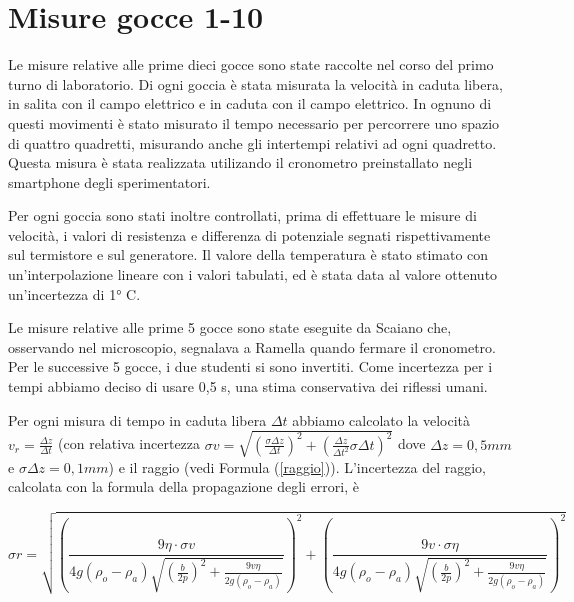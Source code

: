 \documentclass{article}
\begin{document}
\section{Misure gocce 1-10}

Le misure relative alle prime dieci gocce sono state raccolte nel corso del primo turno di laboratorio. Di ogni goccia è stata misurata la velocità in caduta libera, in salita con il campo elettrico e in caduta con il campo elettrico. In ognuno di questi movimenti è stato misurato il tempo necessario per percorrere uno spazio di quattro quadretti, misurando anche gli intertempi relativi ad ogni quadretto. Questa misura è stata realizzata utilizando il cronometro preinstallato negli smartphone degli sperimentatori.

\vspace{3mm}

Per ogni goccia sono stati inoltre controllati, prima di effettuare le misure di velocità, i valori di resistenza e differenza di potenziale segnati rispettivamente sul termistore e sul generatore. Il valore della temperatura è stato stimato con un'interpolazione lineare con i valori tabulati, ed è stata data al valore ottenuto un'incertezza di 1° C.

\vspace{3mm}

Le misure relative alle prime 5 gocce sono state eseguite da Scaiano che, osservando nel microscopio, segnalava a Ramella quando fermare il cronometro. Per le successive 5 gocce, i due studenti si sono invertiti. Come incertezza per i tempi abbiamo deciso di usare 0,5 s, una stima conservativa dei riflessi umani.

\vspace{3mm}

Per ogni misura di tempo in caduta libera $\Delta t$ abbiamo calcolato la velocità $v_r = \frac{\Delta z}{\Delta t}$ (con relativa incertezza $\sigma v = \sqrt{(\frac{\sigma \Delta z}{\Delta t})^2 + (\frac{\Delta z}{\Delta t^2}\sigma \Delta t)^2}$ dove $\Delta z = 0,5 mm$ e $ \sigma\Delta z = 0,1 mm$) e il raggio (vedi Formula (\ref{raggio})). L'incertezza del raggio, calcolata con la formula della propagazione degli errori, è

\[\sigma r = \sqrt{\left( \frac{9 \eta \cdot \sigma v}{4g(\rho_o - \rho_a)\sqrt{(\frac{b}{2p})^2+\frac{9v\eta}{2g(\rho_o - \rho_a)}}}\right)^2 + \left( \frac{9v \cdot \sigma \eta}{4g(\rho_o - \rho_a)\sqrt{(\frac{b}{2p})^2+\frac{9v\eta}{2g(\rho_o - \rho_a)}}}\right)^2} \]
\end{document}
